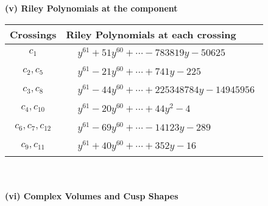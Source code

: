 \documentclass[1p]{elsarticle_modified}
\theoremstyle{definition}
\begin{document}
\newpage\renewcommand{\arraystretch}{1}
\flushleft \textbf{(v) Riley Polynomials at the component}\newline \\
\begin{tabular}{m{50pt}|m{274pt}}
Crossings & \hspace{64pt}Riley Polynomials at each crossing \\
\hline $$\begin{aligned}c_{1}\end{aligned}$$&$\begin{aligned}
&y^{61}+51 y^{60}+\cdots-783819 y-50625
\end{aligned}$\\
\hline $$\begin{aligned}c_{2},c_{5}\end{aligned}$$&$\begin{aligned}
&y^{61}-21 y^{60}+\cdots+741 y-225
\end{aligned}$\\
\hline $$\begin{aligned}c_{3},c_{8}\end{aligned}$$&$\begin{aligned}
&y^{61}-44 y^{60}+\cdots+225348784 y-14945956
\end{aligned}$\\
\hline $$\begin{aligned}c_{4},c_{10}\end{aligned}$$&$\begin{aligned}
&y^{61}-20 y^{60}+\cdots+44 y^2-4
\end{aligned}$\\
\hline $$\begin{aligned}c_{6},c_{7},c_{12}\end{aligned}$$&$\begin{aligned}
&y^{61}-69 y^{60}+\cdots-14123 y-289
\end{aligned}$\\
\hline $$\begin{aligned}c_{9},c_{11}\end{aligned}$$&$\begin{aligned}
&y^{61}+40 y^{60}+\cdots+352 y-16
\end{aligned}$\\
\hline
\end{tabular}\\~\\
\newpage\flushleft \textbf{(vi) Complex Volumes and Cusp Shapes}
\end{document}
